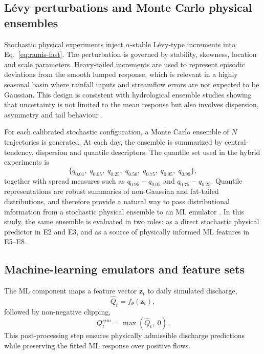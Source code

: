 \subsection{L\'{e}vy perturbations and Monte Carlo physical ensembles}
\label{subsec:levy}

Stochastic physical experiments inject $\alpha$-stable L\'{e}vy-type
increments into Eq.~\ref{eq:ramis-fast}. The perturbation is governed
by stability, skewness, location and scale parameters. Heavy-tailed
increments are used to represent episodic deviations from the smooth
lumped response, which is relevant in a highly seasonal basin where
rainfall inputs and streamflow errors are not expected to be Gaussian.
This design is consistent with hydrological ensemble studies showing
that uncertainty is not limited to the mean response but also involves
dispersion, asymmetry and tail behaviour
\citep{hong2006uncertainty,gabellani2007propagation,abaza2017incidence}.

For each calibrated stochastic configuration, a Monte Carlo ensemble of
$N$ trajectories is generated. At each day, the ensemble is summarized
by central-tendency, dispersion and quantile descriptors. The quantile
set used in the hybrid experiments is
\begin{equation}
\{q_{0.01},\;q_{0.05},\;q_{0.25},\;q_{0.50},\;q_{0.75},
  \;q_{0.95},\;q_{0.99}\},
\label{eq:quantiles}
\end{equation}
together with spread measures such as $q_{0.95}-q_{0.05}$ and
$q_{0.75}-q_{0.25}$. Quantile representations are robust summaries of
non-Gaussian and fat-tailed distributions, and therefore provide a
natural way to pass distributional information from a stochastic
physical ensemble to an ML emulator \citep{swiderski2016aggregation}.
In this study, the same ensemble is evaluated in two roles: as a direct
stochastic physical predictor in E2 and E3, and as a source of
physically informed ML features in E5--E8.

\subsection{Machine-learning emulators and feature sets}
\label{subsec:emulator}

The ML component maps a feature vector $\mathbf{z}_t$ to daily simulated
discharge,
\begin{equation}
\hat{Q}_t = f_\theta(\mathbf{z}_t),
\label{eq:emulator}
\end{equation}
followed by non-negative clipping,
\begin{equation}
Q^{sim}_t = \max(\hat{Q}_t,\;0).
\label{eq:ml-clipping}
\end{equation}
This post-processing step ensures physically admissible discharge
predictions while preserving the fitted ML response over positive
flows.

